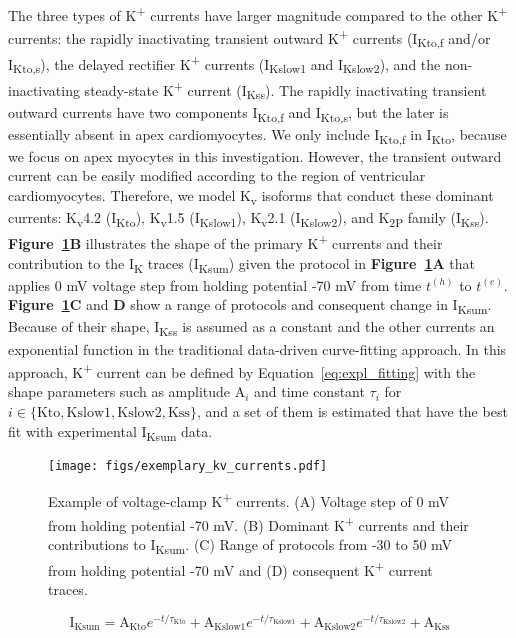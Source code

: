 \documentclass[11pt]{article}
\begin{document}
The three types of K\textsuperscript{+} currents have larger magnitude compared to the other K\textsuperscript{+} currents: the rapidly inactivating transient outward K\textsuperscript{+} currents (I\textsubscript{Kto,f} and/or I\textsubscript{Kto,s}), the delayed rectifier K\textsuperscript{+} currents (I\textsubscript{Kslow1} and I\textsubscript{Kslow2}), and the non-inactivating steady-state K\textsuperscript{+} current (I\textsubscript{Kss}). The rapidly inactivating transient outward currents have two components I\textsubscript{Kto,f} and I\textsubscript{Kto,s}, but the later is essentially absent in apex cardiomyocytes. We only include I\textsubscript{Kto,f} in I\textsubscript{Kto}, because we focus on apex myocytes in this investigation. However, the transient outward current can be easily modified according to the region of ventricular cardiomyocytes. Therefore, we model K\textsubscript{v} isoforms that conduct these dominant currents: K\textsubscript{v}4.2 (I\textsubscript{Kto}), K\textsubscript{v}1.5 (I\textsubscript{Kslow1}), K\textsubscript{v}2.1 (I\textsubscript{Kslow2}), and K\textsubscript{2P} family (I\textsubscript{Kss}). \textbf{Figure~\ref{fig:kcurrent_example}B} illustrates the shape of the primary K\textsuperscript{+} currents and their contribution to the I\textsubscript{K} traces (I\textsubscript{Ksum}) given the protocol in \textbf{Figure~\ref{fig:kcurrent_example}A} that applies 0 mV voltage step from holding potential -70 mV from time $t^{(h)}$ to $t^{(e)}$. \textbf{Figure~\ref{fig:kcurrent_example}C} and \textbf{D} show a range of protocols and consequent change in I\textsubscript{Ksum}. Because of their shape, I\textsubscript{Kss} is assumed as a constant and the other currents an exponential function in the traditional data-driven curve-fitting approach. In this approach, K\textsuperscript{+} current can be defined by Equation~\ref{eq:expl_fitting} with the shape parameters such as amplitude $\mathrm{A}_{i}$ and time constant $\tau_{i}$ for $i \in \{\mathrm{Kto}, \mathrm{Kslow1}, \mathrm{Kslow2}, \mathrm{Kss}\}$, and a set of them is estimated that have the best fit with experimental I\textsubscript{Ksum} data.
\begin{figure}[!ht]
    \centering
    \texttt{[image: figs/exemplary\_kv\_currents.pdf]}
    \caption{Example of voltage-clamp K\textsuperscript{+} currents. (A) Voltage step of 0 mV from holding potential -70 mV. (B) Dominant K\textsuperscript{+} currents and their contributions to I\textsubscript{Ksum}. (C) Range of protocols from -30 to 50 mV from holding potential -70 mV and (D) consequent K\textsuperscript{+} current traces.}
    \label{fig:kcurrent_example}
\end{figure}
\begin{equation}
    \label{eq:expl_fitting}
    \mathrm{I}_{\mathrm{Ksum}} = \mathrm{A}_{\mathrm{Kto}}e^{-t/\tau_{\mathrm{Kto}}} + \mathrm{A}_{\mathrm{Kslow1}}e^{-t/\tau_{\mathrm{Kslow1}}} + \mathrm{A}_{\mathrm{Kslow2}}e^{-t/\tau_{\mathrm{Kslow2}}} +  \mathrm{A}_{\mathrm{Kss}}
\end{equation}
\end{document}
